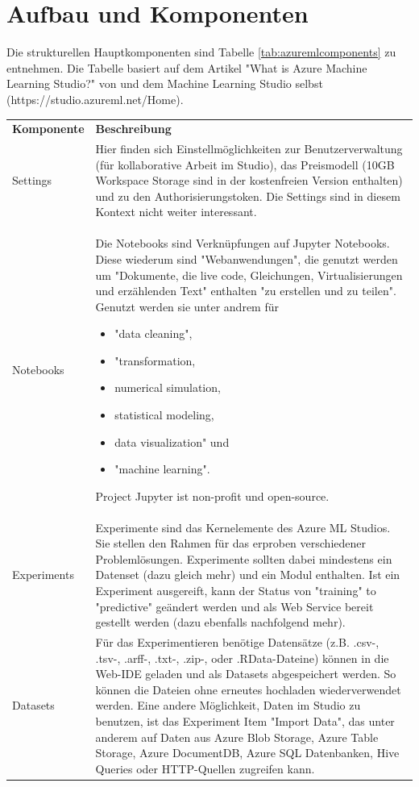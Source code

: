 \section{Aufbau und Komponenten}\label{sec:auK1}
Die strukturellen Hauptkomponenten sind Tabelle \ref{tab:azuremlcomponents} zu entnehmen. Die Tabelle basiert auf dem Artikel "What is Azure Machine Learning Studio?" von \citep{ericson_what_2017} und dem Machine Learning Studio selbst (https://studio.azureml.net/Home).
\begin{longtable}[H]{|p{}|p{14cm}|}
\hline
\textbf{Komponente} & \textbf{Beschreibung}\\ 
\hhline{==}
Settings & Hier finden sich Einstellmöglichkeiten zur Benutzerverwaltung (für kollaborative Arbeit im Studio), das Preismodell (10GB Workspace Storage sind in der kostenfreien Version enthalten) und zu den Authorisierungstoken. Die Settings sind in diesem Kontext nicht weiter interessant. \\
\hline
Notebooks & Die Notebooks sind Verknüpfungen auf Jupyter Notebooks. Diese wiederum sind "Webanwendungen", die genutzt werden um "Dokumente, die live code, Gleichungen, Virtualisierungen und erzählenden Text" enthalten "zu erstellen und zu teilen". Genutzt werden sie unter andrem für 
\begin{itemize}
\item "data cleaning",
\item "transformation,
\item numerical simulation,
\item statistical modeling,
\item data visualization" und
\item "machine learning"\citep{projectjupyter_jupyter_2017}.
\end{itemize}
Project Jupyter ist non-profit und open-source.\citep{projectjupyter_about_2017} \\
\hline
Experiments & Experimente sind das Kernelemente des Azure ML Studios. Sie stellen den Rahmen für das erproben verschiedener Problemlösungen. Experimente sollten dabei mindestens ein Datenset (dazu gleich mehr) und ein Modul enthalten. Ist ein Experiment ausgereift, kann der Status von "training" to "predictive" geändert werden und als Web Service bereit gestellt werden (dazu ebenfalls nachfolgend mehr).\\
\hline
Datasets & Für das Experimentieren benötige Datensätze (z.B. .csv-, .tsv-, .arff-, .txt-, .zip-, oder .RData-Dateine) können in die Web-IDE geladen und als Datasets abgespeichert werden. So können die Dateien ohne erneutes hochladen wiederverwendet werden. Eine andere Möglichkeit, Daten im Studio zu benutzen, ist das Experiment Item "Import Data", das unter anderem auf Daten aus Azure Blob Storage, Azure Table Storage, Azure DocumentDB, Azure SQL Datenbanken, Hive Queries oder HTTP-Quellen zugreifen kann.\\

\end{longtable}

